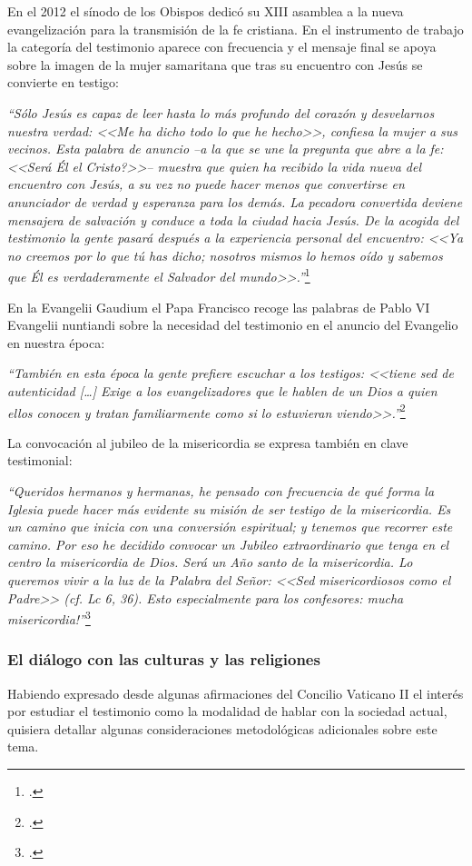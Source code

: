\documentclass[11pt]{article}
\begin{document}
En el 2012 el sínodo de los Obispos dedicó su XIII asamblea a la nueva evangelización para la transmisión de la fe cristiana. En el instrumento de trabajo la categoría del testimonio aparece con frecuencia y el mensaje final se apoya sobre la imagen de la mujer samaritana que tras su encuentro con Jesús se convierte en testigo:

\emph{``Sólo Jesús es capaz de leer hasta lo más profundo del corazón y desvelarnos nuestra verdad: <<Me ha dicho todo lo que he hecho>>, confiesa la mujer a sus vecinos. Esta palabra de anuncio --a la que se une la pregunta que abre a la fe: <<\textquestiondown{}Será Él el Cristo?>>-- muestra que quien ha recibido la vida nueva del encuentro con Jesús, a su vez no puede hacer menos que convertirse en anunciador de verdad y esperanza para los demás. La pecadora convertida deviene mensajera de salvación y conduce a toda la ciudad hacia Jesús. De la acogida del testimonio la gente pasará después a la experiencia personal del encuentro: <<Ya no creemos por lo que tú has dicho; nosotros mismos lo hemos oído y sabemos que Él es verdaderamente el Salvador del mundo>>.''}\footcite{sinod}

En la Evangelii Gaudium el Papa Francisco recoge las palabras de Pablo VI Evangelii nuntiandi sobre la necesidad del testimonio en el anuncio del Evangelio en nuestra época:

\emph{``También en esta época la gente prefiere escuchar a los testigos: <<tiene sed de autenticidad […] Exige a los
evangelizadores que le hablen de un Dios a quien ellos conocen y tratan familiarmente como si lo
estuvieran viendo>>.''}\footcite[n. 150]{EG}

La convocación al jubileo de la misericordia se expresa también en clave testimonial:

\emph{``Queridos hermanos y hermanas, he pensado con frecuencia de qué forma la Iglesia puede hacer más evidente su misión de ser testigo de la misericordia. Es un camino que inicia con una conversión espiritual; y tenemos que recorrer este camino. Por eso he decidido convocar un Jubileo extraordinario que tenga en el centro la misericordia de Dios. Será un Año santo de la misericordia. Lo queremos vivir a la luz de la Palabra del Señor: <<Sed misericordiosos como el Padre>> (cf. Lc 6, 36). Esto especialmente para los confesores: \textexclamdown{}mucha misericordia!''}\footcite{fran_mis}

\subsubsection{El diálogo con las culturas y las religiones}
Habiendo expresado desde algunas afirmaciones del Concilio Vaticano II el interés por estudiar el testimonio como la modalidad de hablar con la sociedad actual, quisiera detallar algunas consideraciones metodológicas adicionales sobre este tema.
\end{document}
